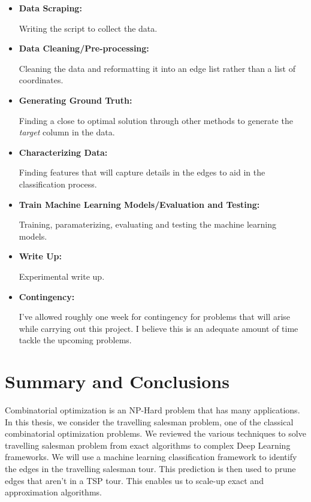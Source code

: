 \documentclass[]{UCD_CS_FYP_Report}
\begin{document}
\begin{itemize}
    \item \textbf{Data Scraping: }
    
    Writing the script to collect the data.
    \item \textbf{Data Cleaning/Pre-processing: }
    
    Cleaning the data and reformatting it into an edge list rather than a list of coordinates.
    \item \textbf{Generating Ground Truth: }
    
    Finding a close to optimal solution through other methods to generate the \textit{target} column in the data.
    \item \textbf{Characterizing Data: }
    
    Finding features that will capture details in the edges to aid in the classification process.
    \item \textbf{Train Machine Learning Models/Evaluation and Testing: }
    
    Training, paramaterizing, evaluating and testing the machine learning models.
    \item \textbf{Write Up: }
    
    Experimental write up.
    \item \textbf{Contingency: }
    
    I've allowed roughly one week for contingency for problems that will arise while carrying out this project. I believe this is an adequate amount of time tackle the upcoming problems.
\end{itemize}

\chapter{Summary and Conclusions}
Combinatorial optimization is an NP-Hard problem that has many applications. In this thesis, we consider the travelling salesman problem, one of the classical combinatorial optimization problems. We reviewed the various techniques to solve travelling salesman problem from exact algorithms to complex Deep Learning frameworks. We will use a machine learning classification framework to identify the edges in the travelling salesman tour. This prediction is then used to prune edges that aren’t in a TSP tour. This enables us to scale-up exact and approximation algorithms. 

\end{document}
